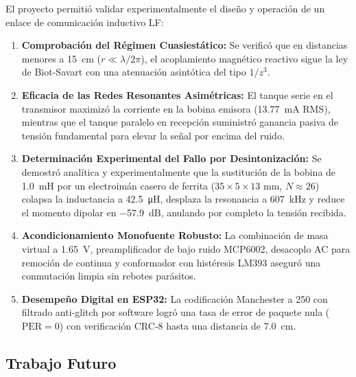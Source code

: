 El proyecto permitió validar experimentalmente el diseño y operación de un enlace de comunicación inductivo LF:
\begin{enumerate}
    \item \textbf{Comprobación del Régimen Cuasiestático:} Se verificó que en distancias menores a \SI{15}{\centi\meter} ($r \ll \lambda / 2\pi$), el acoplamiento magnético reactivo sigue la ley de Biot-Savart con una atenuación asintótica del tipo $1/z^3$.
    \item \textbf{Eficacia de las Redes Resonantes Asimétricas:} El tanque serie en el transmisor maximizó la corriente en la bobina emisora (\SI{13.77}{\milli\ampere} RMS), mientras que el tanque paralelo en recepción suministró ganancia pasiva de tensión fundamental para elevar la señal por encima del ruido.
    \item \textbf{Determinación Experimental del Fallo por Desintonización:} Se demostró analítica y experimentalmente que la sustitución de la bobina de \SI{1.0}{\milli\henry} por un electroimán casero de ferrita ($35 \times 5 \times 13\text{ mm}$, $N\approx 26$) colapsa la inductancia a \SI{42.5}{\micro\henry}, desplaza la resonancia a \SI{607}{\kilo\hertz} y reduce el momento dipolar en \SI{-57.9}{\deci\bel}, anulando por completo la tensión recibida.
    \item \textbf{Acondicionamiento Monofuente Robusto:} La combinación de masa virtual a \SI{1.65}{\volt}, preamplificador de bajo ruido MCP6002, desacoplo AC para remoción de continua y conformador con histéresis LM393 aseguró una conmutación limpia sin rebotes parásitos.
    \item \textbf{Desempeño Digital en ESP32:} La codificación Manchester a \SI{250}{} con filtrado anti-glitch por software logró una tasa de error de paquete nula ($\text{PER} = 0$) con verificación CRC-8 hasta una distancia de \SI{7.0}{\centi\meter}.
\end{enumerate}

\subsection{Trabajo Futuro}
\label{subsec:trabajo_futuro}

